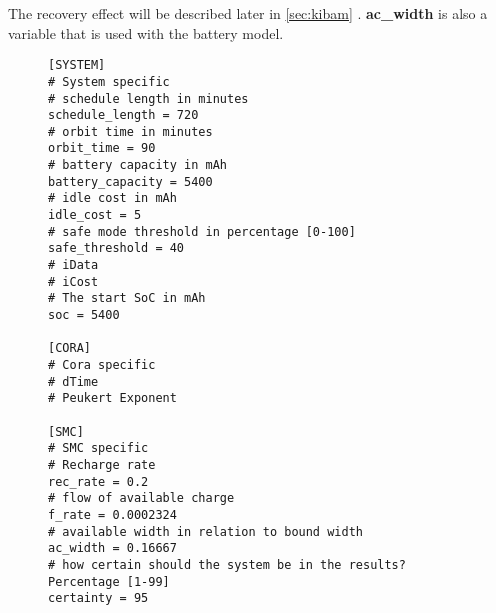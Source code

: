 The recovery effect will be described later in \cref{sec:kibam} .
\textbf{ac\_width} is also a variable that is used with the battery model.
\begin{figure}[H]
\begin{lstlisting}[caption={An example of how the environment can be defined}, label=lst:ini, language=text]
[SYSTEM]
# System specific
# schedule length in minutes
schedule_length = 720
# orbit time in minutes
orbit_time = 90
# battery capacity in mAh
battery_capacity = 5400
# idle cost in mAh
idle_cost = 5
# safe mode threshold in percentage [0-100]
safe_threshold = 40
# iData
# iCost
# The start SoC in mAh
soc = 5400

[CORA]
# Cora specific
# dTime
# Peukert Exponent

[SMC]
# SMC specific
# Recharge rate
rec_rate = 0.2
# flow of available charge
f_rate = 0.0002324
# available width in relation to bound width
ac_width = 0.16667
# how certain should the system be in the results? Percentage [1-99]
certainty = 95
\end{lstlisting}
\end{figure}